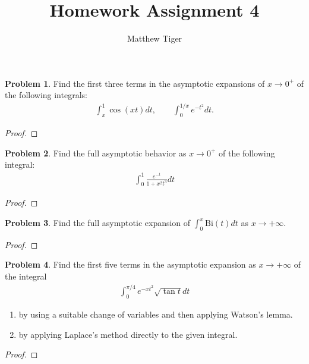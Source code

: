 \documentclass[12pt]{article}
\title{Homework Assignment 4}
\author{Matthew Tiger}
\theoremstyle{definition}
\newtheorem{problem}{Problem}
\begin{document}
\maketitle


\begin{problem}
  Find the first three terms in the asymptotic expansions of $x \to 0^+$ of the following
  integrals:
  \begin{align*}
    \int_x^1 \cos(xt)dt, \qquad \int_0^{1/x} e^{-t^2}dt.
  \end{align*}
\end{problem}

\begin{proof}
\end{proof}
\newpage


\begin{problem}
  Find the full asymptotic behavior as $x \to 0^+$ of the following integral:
  \begin{align*}
    \int_{0}^1 \frac{e^{-t}}{1 + x^2t^3}dt
  \end{align*}
\end{problem}

\begin{proof}
\end{proof}
\newpage

\begin{problem}
  Find the full asymptotic expansion of $\int_0^x \text{Bi}(t) dt$ as $x \to +\infty$.
\end{problem}

\begin{proof}
\end{proof}
\newpage


\begin{problem}
  Find the first five terms in the asymptotic expansion as $x \to +\infty$ of the integral
  \begin{align*}
    \int_0^{\pi/4} e^{-xt^2}\sqrt{\tan t}   dt
  \end{align*}
  \begin{enumerate}
    \item by using a suitable change of variables and then applying Watson's lemma.
    \item by applying Laplace's method directly to the given integral.
  \end{enumerate}
\end{problem}

\begin{proof}
\end{proof}
\newpage
\end{document}
